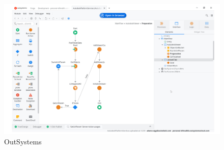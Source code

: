 \begin{figure}[H] 
    \centering
    \includegraphics[width=15cm]{Figures/outsystems.png}
    \caption{OutSystems}
    \label{fig:my_label} %
\end{figure}

